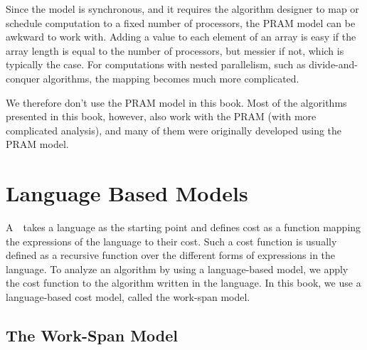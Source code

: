 \begin{cluster}
\label{grp:grm:analysis::models::critique-of-pram}

\begin{gram}
\label{grm:analysis::models::critique-of-pram}
Since the model is synchronous, and it requires the algorithm designer to map
or schedule computation to a fixed number of processors, the PRAM model can be awkward
to work with.
Adding a value to each element of an array is easy if the array
length is equal to the number of processors, but messier if not, which is
typically the case.
For computations with nested parallelism, such as divide-and-conquer
algorithms, the mapping becomes much more complicated.

We therefore don't use the PRAM model in this book.
Most of the algorithms presented in this book, however, also work with the
PRAM (with more complicated analysis), and many of them were
originally developed using the PRAM model.

\end{gram}
\end{cluster}


\section{Language Based Models}
\label{sec:analysis::models::language}

\begin{cluster}
\label{grp:grm:analysis::models::language-based-cost-models}

\begin{gram}
\label{grm:analysis::models::language-based-cost-models}
A~~takes a language as the starting point
and defines cost as a function mapping the expressions of the language
to their cost.
Such a cost function is usually defined as a recursive function over
the different forms of expressions in the language.  
To analyze an algorithm by using a language-based model, we apply the
cost function to the algorithm written in the language.
In this book, we use a language-based cost model, called the work-span
model.

\end{gram}
\end{cluster}


\subsection{The Work-Span Model}
\label{sec:analysis::models::language:ws}

